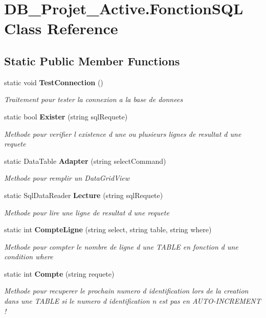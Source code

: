 \section{D\+B\+\_\+\+Projet\+\_\+\+Active.\+Fonction\+S\+QL Class Reference}
\label{class_d_b___projet___active_1_1_fonction_s_q_l}
\subsection*{Static Public Member Functions}
\begin{DoxyCompactItemize}
\item 
static void \textbf{ Test\+Connection} ()
\begin{DoxyCompactList}\small\item\em Traitement pour tester la connexion a la base de donnees \end{DoxyCompactList}\item 
static bool \textbf{ Exister} (string sql\+Requete)
\begin{DoxyCompactList}\small\item\em Methode pour verifier l existence d une ou plusieurs lignes de resultat d une requete \end{DoxyCompactList}\item 
static Data\+Table \textbf{ Adapter} (string select\+Command)
\begin{DoxyCompactList}\small\item\em Methode pour remplir un Data\+Grid\+View \end{DoxyCompactList}\item 
static Sql\+Data\+Reader \textbf{ Lecture} (string sql\+Requete)
\begin{DoxyCompactList}\small\item\em Methode pour lire une ligne de resultat d une requete \end{DoxyCompactList}\item 
static int \textbf{ Compte\+Ligne} (string select, string table, string where)
\begin{DoxyCompactList}\small\item\em Methode pour compter le nombre de ligne d une T\+A\+B\+LE en fonction d une condition where \end{DoxyCompactList}\item 
static int \textbf{ Compte} (string requete)
\begin{DoxyCompactList}\small\item\em Methode pour recuperer le prochain numero d identification lors de la creation dans une T\+A\+B\+LE si le numero d identification n est pas en A\+U\+T\+O-\/\+I\+N\+C\+R\+E\+M\+E\+NT ! \end{DoxyCompactList}\item 

\end{DoxyCompactItemize}
